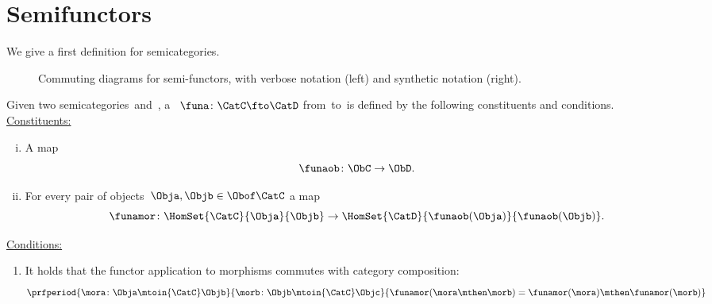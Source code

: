 
\section{Semifunctors}

We give a first definition for semicategories.


\begin{figure*}[b]
	\begin{ctdefinitionshade}
	\end{ctdefinitionshade}
	\caption{Commuting diagrams for semi-functors, with verbose notation (left) and synthetic notation (right).
	}
\end{figure*}

\begin{ctdefinition}
	\label{def:semi-functor}
	Given two semicategories~\CatC and~\CatD, a \emph{}~$\funa\colon \CatC\fto \CatD$ from~\CatC to~\CatD is defined by the following constituents and conditions.
	\\
	\underline{Constituents:}
	\begin{enumerate}
		[i)]
		\item A map
		      \begin{equation}
			      \funaob\colon \ObC \to \ObD.
		      \end{equation}
		\item For every pair of objects~$\Obja, \Objb\in \Obof\CatC$ a map
		      \begin{equation}
			      \funamor\colon \HomSet{\CatC}{\Obja}{\Objb} \to \HomSet{\CatD}{\funaob(\Obja)}{\funaob(\Objb)}.
		      \end{equation}
	\end{enumerate}
	\underline{Conditions:}
	\begin{enumerate}
		\item It holds that the functor application to morphisms commutes with category composition:
		      \begin{equation}
			      \prfperiod{
				      \mora\colon \Obja \mtoin{\CatC} \Objb
			      }{
				      \morb\colon \Objb \mtoin{\CatC} \Objc
			      }{
				      \funamor(\mora \mthen \morb)=\funamor(\mora)\mthen \funamor(\morb)
			      }
		      \end{equation}
	\end{enumerate}
\end{ctdefinition}

